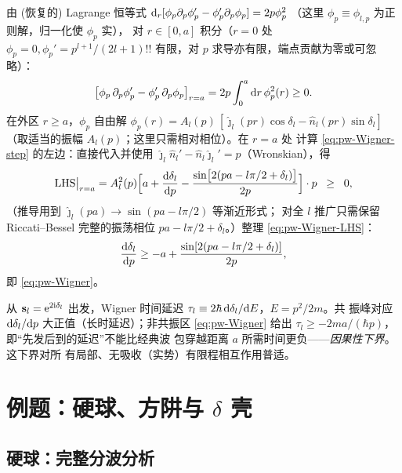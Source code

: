\begin{proof*}
由 (恢复的) Lagrange 恒等式
$\mathrm{d}_r[\phi_p\partial_p\phi_p'-\phi_p'\partial_p\phi_p]=2p\phi_p^2$
（这里 $\phi_p\equiv\phi_{l,p}$ 为正则解，归一化使 $\phi_p$ 实），
对 $r\in[0,a]$ 积分（$r=0$ 处 $\phi_p=0,\phi_p'=p^{l+1}/(2l+1)!!$
有限，对 $p$ 求导亦有限，端点贡献为零或可忽略）：
\begin{equation}\label{eq:pw-Wigner-step}
\bigl[\phi_p\,\partial_p\phi_p'-\phi_p'\,\partial_p\phi_p\bigr]_{r=a}
=2p\int_0^a \mathrm{d} r\,\phi_p^2(r)\ge 0.
\end{equation}
在外区 $r\ge a$，$\phi_p$ 自由解
$\phi_p(r)=A_l(p)\,[\hat\jmath_l(pr)\cos\delta_l-\hat n_l(pr)\sin\delta_l]$
（取适当的振幅 $A_l(p)$；这里只需相对相位）。在 $r=a$ 处
计算 \eqref{eq:pw-Wigner-step} 的左边：直接代入并使用
$\hat\jmath_l\hat n_l'-\hat n_l\hat\jmath_l'=p$（Wronskian），得
\begin{equation}\label{eq:pw-Wigner-LHS}
\text{LHS}\big|_{r=a}=A_l^2(p)\Bigl[a+\frac{\mathrm{d}\delta_l}{\mathrm{d} p}
-\frac{\sin\bigl[2(pa-l\pi/2+\delta_l)\bigr]}{2p}\Bigr]\cdot p
\;\;\ge\;\;0,
\end{equation}
（推导用到 $\hat\jmath_l(pa)\to\sin(pa-l\pi/2)$ 等渐近形式；
对全 $l$ 推广只需保留 Riccati--Bessel 完整的振荡相位
$pa-l\pi/2+\delta_l$。）整理 \eqref{eq:pw-Wigner-LHS}：
\[
\frac{\mathrm{d}\delta_l}{\mathrm{d} p}\ge -a+\frac{\sin[2(pa-l\pi/2+\delta_l)]}{2p},
\]
即 \eqref{eq:pw-Wigner}。
\end{proof*}

\begin{remark}
从 $\mathbf s_l=\mathrm{e}^{2\mathrm{i}\delta_l}$ 出发，Wigner 时间延迟
$\tau_l\equiv 2\hbar\,\mathrm{d}\delta_l/\mathrm{d} E$，$E=p^2/2m$。共
振峰对应 $\mathrm{d}\delta_l/\mathrm{d} p$ 大正值（长时延迟）；非共振区
\eqref{eq:pw-Wigner} 给出
$\tau_l\ge -2ma/(\hbar p)$，即“先发后到的延迟”不能比经典波
包穿越距离 $a$ 所需时间更负——\emph{因果性下界}。这下界对所
有局部、无吸收（实势）有限程相互作用普适。
\end{remark}

\section{例题：硬球、方阱与 $\delta$ 壳}\label{sec:pw-examples}

\subsection{硬球：完整分波分析}\label{sec:pw-hardsphere}

